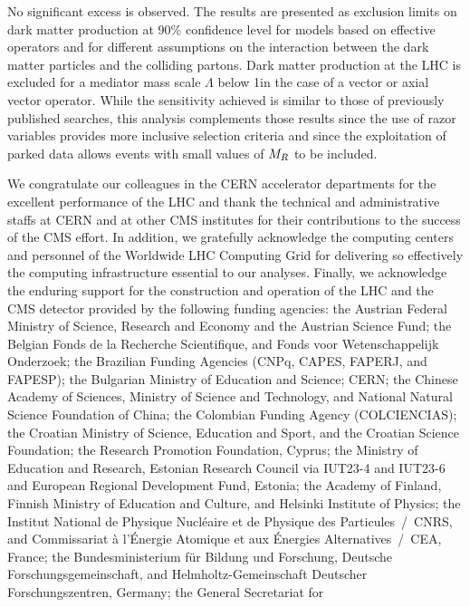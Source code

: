 No significant excess is observed. The results are presented as
exclusion limits on dark matter production at 90\% confidence level
for models based on effective operators and for different assumptions
on the interaction between the dark matter particles and the colliding
partons. Dark matter production at the LHC is excluded for a mediator
mass scale $\Lambda$ below 1\TeV in the case of a vector or axial
vector operator. While the sensitivity achieved is similar to those of previously
published searches, this analysis complements those results since the
use of razor variables provides more inclusive selection criteria and
since the exploitation of parked data allows events with small values of $M_R$ to be included.


\begin{acknowledgments}
We congratulate our colleagues in the CERN accelerator departments for
the excellent performance of the LHC and thank the technical and
administrative staffs at CERN and at other CMS institutes for their
contributions to the success of the CMS effort. In addition, we
gratefully acknowledge the computing centers and personnel of the
Worldwide LHC Computing Grid for delivering so effectively the
computing infrastructure essential to our analyses. Finally, we
acknowledge the enduring support for the construction and operation of
the LHC and the CMS detector provided by the following funding
agencies: the Austrian Federal Ministry of Science, Research and
Economy and the Austrian Science Fund; the Belgian Fonds de la
Recherche Scientifique, and Fonds voor Wetenschappelijk Onderzoek; the
Brazilian Funding Agencies (CNPq, CAPES, FAPERJ, and FAPESP); the
Bulgarian Ministry of Education and Science; CERN; the Chinese Academy
of Sciences, Ministry of Science and Technology, and National Natural
Science Foundation of China; the Colombian Funding Agency
(COLCIENCIAS); the Croatian Ministry of Science, Education and Sport,
and the Croatian Science Foundation; the Research Promotion
Foundation, Cyprus; the Ministry of Education and Research, Estonian
Research Council via IUT23-4 and IUT23-6 and European Regional
Development Fund, Estonia; the Academy of Finland, Finnish Ministry of
Education and Culture, and Helsinki Institute of Physics; the Institut
National de Physique Nucl\'eaire et de Physique des Particules~/~CNRS,
and Commissariat \`a l'\'Energie Atomique et aux \'Energies
Alternatives~/~CEA, France; the Bundesministerium f\"ur Bildung und
Forschung, Deutsche Forschungsgemeinschaft, and Helmholtz-Gemeinschaft
Deutscher Forschungszentren, Germany; the General Secretariat for

\end{acknowledgments}
